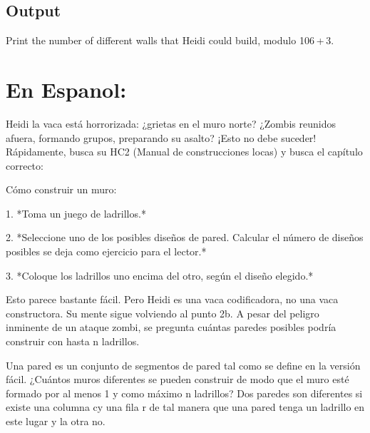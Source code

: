 \documentclass{article}
\begin{document}
    \subsection*{Output}

    \begin{flushleft}
        Print the number of different walls that Heidi could build, modulo 106 + 3.
    \end{flushleft}

    \section*{En Espanol:}


    \begin{flushleft}
        Heidi la vaca está horrorizada: ¿grietas en el muro norte? ¿Zombis reunidos afuera, formando grupos, preparando su asalto? ¡Esto no debe suceder! Rápidamente, busca su HC2 (Manual de construcciones locas) y busca el capítulo correcto:
    \end{flushleft}

    \begin{flushleft}
        Cómo construir un muro:
    \end{flushleft}

    \begin{flushleft}
        1. *Toma un juego de ladrillos.*
    \end{flushleft}

    \begin{flushleft}
        2. *Seleccione uno de los posibles diseños de pared. Calcular el número de diseños posibles se deja como ejercicio para el lector.*
    \end{flushleft}

    \begin{flushleft}
        3. *Coloque los ladrillos uno encima del otro, según el diseño elegido.*
    \end{flushleft}

    \begin{flushleft}
        Esto parece bastante fácil. Pero Heidi es una vaca codificadora, no una vaca constructora. Su mente sigue volviendo al punto 2b. A pesar del peligro inminente de un ataque zombi, se pregunta cuántas paredes posibles podría construir con hasta n ladrillos.
    \end{flushleft}

    \begin{flushleft}
        Una pared es un conjunto de segmentos de pared tal como se define en la versión fácil. ¿Cuántos muros diferentes se pueden construir de modo que el muro esté formado por al menos 1 y como máximo n ladrillos? Dos paredes son diferentes si existe una columna cy una fila r de tal manera que una pared tenga un ladrillo en este lugar y la otra no.
    \end{flushleft}
\end{document}
